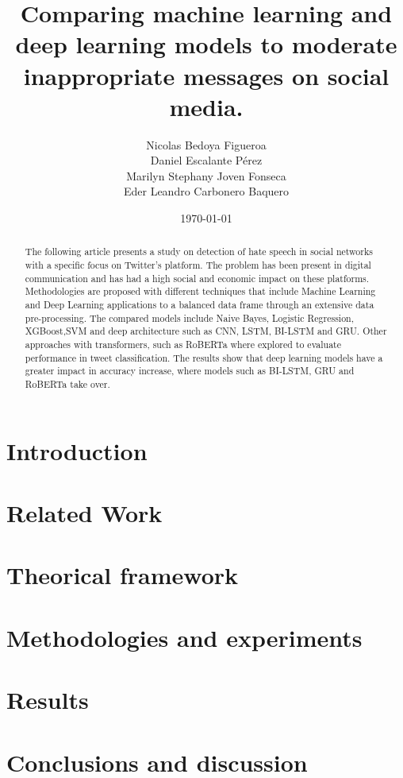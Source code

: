 \documentclass[conference]{IEEEtran}
\title{Comparing machine learning and deep learning models to moderate inappropriate messages on social media.}
\author{Nicolas Bedoya Figueroa \\
Daniel Escalante Pérez \\
Marilyn Stephany Joven Fonseca \\
Eder Leandro Carbonero Baquero \\}
\date{\today}
\begin{document}
\maketitle
\begin{abstract}
The following article presents a study on detection of hate speech in social networks with a specific focus on Twitter's platform. The problem has been present in digital communication and has had a high social and economic impact on these platforms. Methodologies are proposed with different techniques that include Machine Learning and Deep Learning applications to a balanced data frame through an extensive data pre-processing. The compared models include Naive Bayes, Logistic Regression, XGBoost,SVM and deep architecture such as CNN, LSTM, BI-LSTM and GRU. Other approaches with transformers, such as RoBERTa where explored to evaluate performance in tweet classification. The results show that deep learning models have a greater impact in accuracy increase, where models such as BI-LSTM, GRU and RoBERTa take over.
\end{abstract}

\section{Introduction}


\section{Related Work}


\section{Theorical framework}


\section{Methodologies and experiments}
\label{sec:methodologies}


\section{Results}


\section{Conclusions and discussion}




\end{document}
